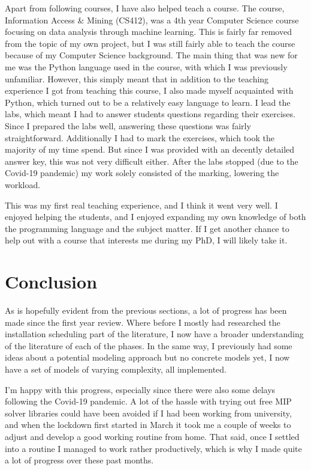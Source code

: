 \documentclass[a4paper,12pt]{article}
\begin{document}
\bigskip

Apart from following courses, I have also helped teach a course. The course, Information Access \& Mining (CS412), was a 4th year Computer Science course focusing on data analysis through machine learning. This is fairly far removed from the topic of my own project, but I was still fairly able to teach the course because of my Computer Science background. The main thing that was new for me was the Python language used in the course, with which I was previously unfamiliar. However, this simply meant that in addition to the teaching experience I got from teaching this course, I also made myself acquainted with Python, which turned out to be a relatively easy language to learn. I lead the labs, which meant I had to answer students questions regarding their exercises. Since I prepared the labs well, answering these questions was fairly straightforward. Additionally I had to mark the exercises, which took the majority of my time spend. But since I was provided with an decently detailed answer key, this was not very difficult either. After the labs stopped (due to the Covid-19 pandemic) my work solely consisted of the marking, lowering the workload. 

This was my first real teaching experience, and I think it went very well. I enjoyed helping the students, and I enjoyed expanding my own knowledge of both the programming language and the subject matter. If I get another chance to help out with a course that interests me during my PhD, I will likely take it.

\pagebreak

\section{Conclusion}\label{s:concl}
As is hopefully evident from the previous sections, a lot of progress has been made since the first year review. Where before I mostly had researched the installation scheduling part of the literature, I now have a broader understanding of the literature of each of the phases. In the same way, I previously had some ideas about a potential modeling approach but no concrete models yet, I now have a set of models of varying complexity, all implemented. 

I'm happy with this progress, especially since there were also some delays following the Covid-19 pandemic. A lot of the hassle with trying out free MIP solver libraries could have been avoided if I had been working from university, and when the lockdown first started in March it took me a couple of weeks to adjust and develop a good working routine from home. That said, once I settled into a routine I managed to work rather productively, which is why I made quite a lot of progress over these past months. 
\end{document}
